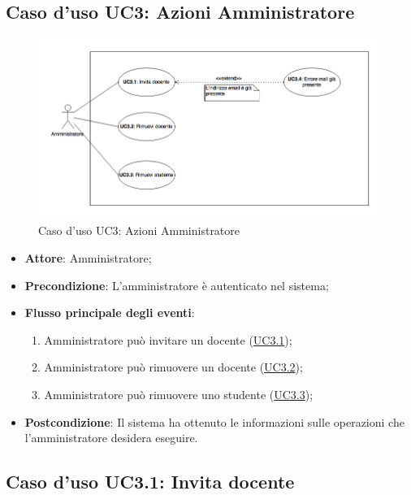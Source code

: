 \documentclass[12pt,a4paper]{article}
\begin{document}
\subsection{Caso d'uso UC3: Azioni Amministratore}
\begin{figure}[H]
	\centering
	\includegraphics[width=\textwidth]{diagramUC3.png}
	\caption{Caso d'uso UC3: Azioni Amministratore}\label{fig:UC3} 
\end{figure}
\begin{itemize}

\item \textbf{Attore}: Amministratore; 
\item \textbf{Precondizione}: L'amministratore è autenticato nel sistema;

\item \textbf{Flusso principale degli eventi}:
\begin{enumerate}
	\item Amministratore può  invitare un docente (\hyperlink{UC3.1}{UC3.1});
	\item Amministratore può rimuovere un docente (\hyperlink{UC3.2}{UC3.2});
	\item Amministratore può rimuovere uno studente (\hyperlink{UC3.3}{UC3.3});
	
\end{enumerate}
\item \textbf{Postcondizione}: Il sistema ha ottenuto le informazioni sulle operazioni che
l’amministratore desidera eseguire.
\end{itemize}
\hypertarget{UC3.1}{}
\subsection{Caso d'uso UC3.1: Invita docente}
\end{document}

